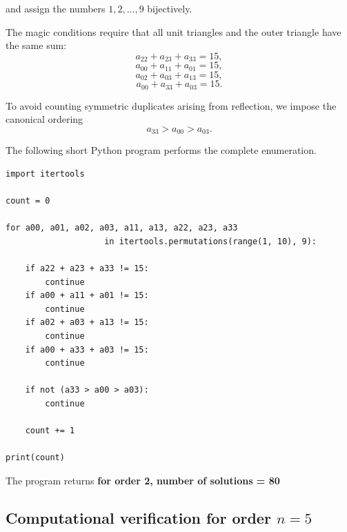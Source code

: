 \documentclass[11pt]{article}
\theoremstyle{plain}
\theoremstyle{definition}
\begin{document}
and assign the numbers \(1,2,\dots,9\) bijectively.

The magic conditions require that all unit triangles and the outer
triangle have the same sum:
\[
a_{22}+a_{23}+a_{33}=15,
\]
\[
a_{00}+a_{11}+a_{01}=15,
\]
\[
a_{02}+a_{03}+a_{13}=15,
\]
\[
a_{00}+a_{33}+a_{03}=15.
\]

To avoid counting symmetric duplicates arising from reflection, we impose
the canonical ordering
\[
a_{33} > a_{00} > a_{03}.
\]

The following short Python program performs the complete enumeration.

\begin{verbatim}
import itertools

count = 0

for a00, a01, a02, a03, a11, a13, a22, a23, a33 
                    in itertools.permutations(range(1, 10), 9):

    if a22 + a23 + a33 != 15:
        continue
    if a00 + a11 + a01 != 15:
        continue
    if a02 + a03 + a13 != 15:
        continue
    if a00 + a33 + a03 != 15:
        continue

    if not (a33 > a00 > a03):
        continue

    count += 1

print(count)
\end{verbatim}



The program returns \textbf{for order 2, number of solutions = 80}

\subsection{Computational verification for order \(n=5\)}
\end{document}
